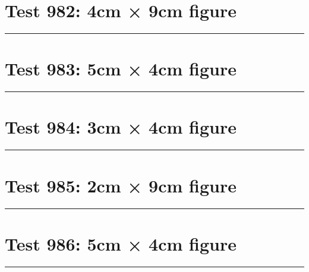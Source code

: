 \documentclass[a4paper,11pt]{article}
\begin{document}
\section*{Test 982: 4cm × 9cm figure}
\begin{swarmwrap}%
  \begin{minipage}[t]{4cm}
    \centering
    \rule{\linewidth}{9cm}
  \end{minipage}%
\end{swarmwrap}%
\swarmwrapnext
\lipsum[82]
\lipsum[83]
\lipsum[84]
\lipsum[85]
\section*{Test 983: 5cm × 4cm figure}
\begin{swarmwrap}%
  \begin{minipage}[t]{5cm}
    \centering
    \rule{\linewidth}{4cm}
  \end{minipage}%
\end{swarmwrap}%
\swarmwrapnext
\lipsum[126]
\lipsum[127]
\lipsum[128]
\section*{Test 984: 3cm × 4cm figure}
\begin{swarmwrap}%
  \begin{minipage}[t]{3cm}
    \centering
    \rule{\linewidth}{4cm}
  \end{minipage}%
\end{swarmwrap}%
\swarmwrapnext
\lipsum[16]
\lipsum[17]
\lipsum[18]
\lipsum[19]
\lipsum[20]
\section*{Test 985: 2cm × 9cm figure}
\begin{swarmwrap}%
  \begin{minipage}[t]{2cm}
    \centering
    \rule{\linewidth}{9cm}
  \end{minipage}%
\end{swarmwrap}%
\swarmwrapnext
\lipsum[55]
\lipsum[56]
\lipsum[57]
\lipsum[58]
\lipsum[59]
\section*{Test 986: 5cm × 4cm figure}
\begin{swarmwrap}%
  \begin{minipage}[t]{5cm}
    \centering
    \rule{\linewidth}{4cm}
  \end{minipage}%
\end{swarmwrap}%
\swarmwrapnext
\lipsum[127]
\lipsum[128]
\lipsum[129]
\lipsum[130]
\end{document}

